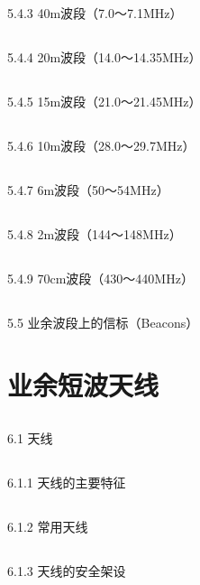 \documentclass[12pt,UTF8]{ctexbook}
\begin{document}
\section{}5.4.3 40m波段（7.0～7.1MHz）
\section{}5.4.4 20m波段（14.0～14.35MHz）
\section{}5.4.5 15m波段（21.0～21.45MHz）
\section{}5.4.6 10m波段（28.0～29.7MHz）
\section{}5.4.7 6m波段（50～54MHz）
\section{}5.4.8 2m波段（144～148MHz）
\section{}5.4.9 70cm波段（430～440MHz）
\section{}5.5 业余波段上的信标（Beacons）

\chapter{业余短波天线}

\section{}6.1 天线
\section{}6.1.1 天线的主要特征
\section{}6.1.2 常用天线
\section{}6.1.3 天线的安全架设
\end{document}
